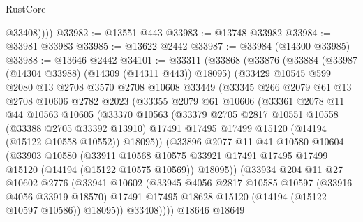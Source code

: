 \begin{lexlean}{RustCore}
\begin{coremodule}
            @33408))))
@33982 := @13551 @443
@33983 := @13748 @33982
@33984 := @33981 @33983
@33985 := @13622 @2442
@33987 := @33984 (@14300 @33985)
@33988 := @13646 @2442
@34101 := @33311
    (@33868
      (@33876
        (@33884
          (@33987 (@14304 @33988) (@14309 (@14311 @443)) @18095)
          (@33429
            @10545
            @599
            @2080
            @13
            @2708
            @3570
            @2708
            @10608
            @33449
            (@33345
              @266
              @2079
              @61
              @13
              @2708
              @10606
              @2782
              @2023
              (@33355
                @2079
                @61
                @10606
                (@33361
                  @2078
                  @11
                  @44
                  @10563
                  @10605
                  (@33370
                    @10563
                    (@33379
                      @2705
                      @2817
                      @10551
                      @10558
                      (@33388 @2705 @33392 @13910)
                      @17491
                      @17495
                      @17499
                      @15120
                      (@14194 (@15122 @10558 @10552))
                      @18095))
                  (@33896
                    @2077
                    @11
                    @41
                    @10580
                    @10604
                    (@33903
                      @10580
                      (@33911
                        @10568
                        @10575
                        @33921
                        @17491
                        @17495
                        @17499
                        @15120
                        (@14194 (@15122 @10575 @10569))
                        @18095))
                    (@33934
                      @204
                      @11
                      @27
                      @10602
                      @2776
                      (@33941
                        @10602
                        (@33945
                          @4056
                          @2817
                          @10585
                          @10597
                          (@33916 @4056 @33919 @18570)
                          @17491
                          @17495
                          @18628
                          @15120
                          (@14194 (@15122 @10597 @10586))
                          @18095))
                      @33408))))
              @18646
              @18649

\end{coremodule}
\end{lexlean}
